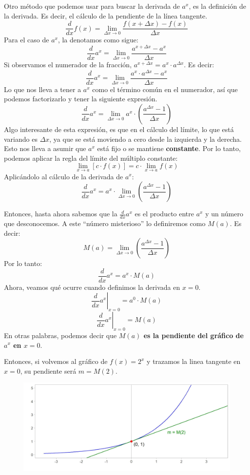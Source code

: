 \documentclass[12pt]{article}
\begin{document}
Otro método que podemos usar para buscar la derivada de $a^{x}$, es la definición de la derivada. Es decir, el cálculo de la pendiente de la línea tangente.
\[\frac{d}{dx} f(x) = \lim_{\Delta x \to 0} \frac{f(x + \Delta x) - f(x)}{\Delta x}\]
Para el caso de $a^{x}$, la denotamos como sigue:
\[\frac{d}{dx} a^{x} = \lim_{\Delta x \to 0} \frac{a^{x + \Delta x} - a^{x}}{\Delta x}\]
Si observamos el numerador de la fracción, $a^{x + \Delta x} = a^{x} \cdot a^{\Delta x}$. Es decir:
\[\frac{d}{dx} a^{x} = \lim_{\Delta x \to 0} \frac{a^{x} \cdot a^{\Delta x} - a^{x}}{\Delta x}\]
Lo que nos lleva a tener a $a^{x}$ como el término común en el numerador, así que podemos factorizarlo y tener la siguiente expresión.
\[\frac{d}{dx} a^{x} = \lim_{\Delta x \to 0} a^{x} \cdot \left(\frac{a^{\Delta x} - 1}{\Delta x}\right)\]
Algo interesante de esta expresión, es que en el cálculo del límite, lo que está variando es $\Delta x$, ya que se está moviendo a cero desde la izquierda y la derecha. Esto nos lleva a asumir que $a^{x}$ está fijo o se mantiene \textbf{constante}. Por lo tanto, podemos aplicar la regla del límite del múltiplo constante:
\[\lim_{x \to a}[c \cdot f(x)] = c \cdot \lim_{x \to a} f(x)\] 
Aplicándolo al cálculo de la derivada de $a^{x}$:
\[\frac{d}{dx} a^{x} = a^{x} \cdot \lim_{\Delta x \to 0} \left(\frac{a^{\Delta x} - 1}{\Delta x}\right)\]

Entonces, hasta ahora sabemos que la $\frac{d}{dx} a^{x}$ es el producto entre $a^{x}$ y un número que desconocemos. A este ``número misterioso'' lo definiremos como $M(a)$. Es decir:
\[M(a) = \lim_{\Delta x \to 0} \left(\frac{a^{\Delta x} - 1}{\Delta x}\right)\]
Por lo tanto:
\[\frac{d}{dx} a^{x} = a^{x} \cdot M(a)\]
Ahora, veamos qué ocurre cuando definimos la derivada en $x = 0$.
\[\left.\frac{d}{dx} a^{x}\right|_{x = 0} = a^{0} \cdot M(a)\]
\[\left.\frac{d}{dx} a^{x}\right|_{x = 0} =  M(a)\]
En otras palabras, podemos decir que \textbf{$M(a)$ es la pendiente del gráfico de $a^{x}$ en $x = 0$}.

Entonces, si volvemos al gráfico de $f(x) = 2^{x}$ y trazamos la linea tangente en $x = 0$, su pendiente será $m = M(2)$.

\begin{figure}[hbt!]
\centering
\includegraphics[scale=0.7]{img/exp_plot_3.jpg}
\end{figure}
\end{document}
